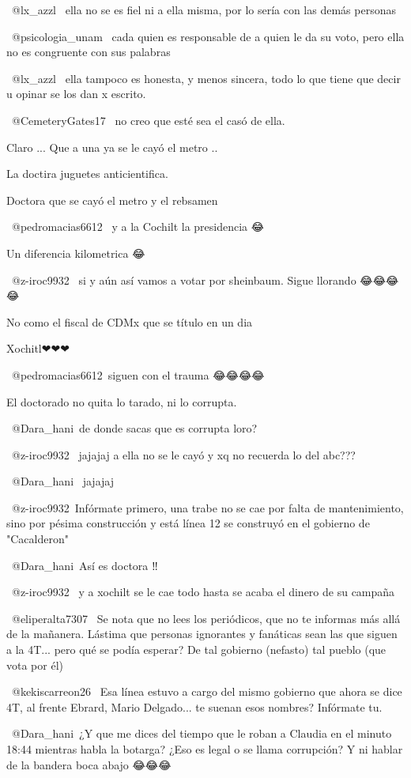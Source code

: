  @lx_azzl  ella no se es fiel ni a ella misma, por lo sería con las demás personas

 @psicologia_unam   cada quien es responsable de a quien le da su voto, pero ella no es congruente con sus palabras

 @lx_azzl  ella tampoco es honesta, y menos sincera, todo lo que tiene que decir u opinar se los dan x escrito.

 @CemeteryGates17  no creo que esté sea el casó de ella.

Claro ... Que a una ya se le cayó el metro ..

La doctira juguetes anticientifica.

Doctora  que se cayó el metro y el rebsamen

​ @pedromacias6612  y a la Cochilt la presidencia 😂

Un diferencia kilometrica 😂

 @z-iroc9932  si y aún así vamos a votar por sheinbaum. Sigue llorando 😂😂😂😂

No como el fiscal de CDMx que se título en un dia

Xochitl❤❤❤

​ @pedromacias6612 siguen con el trauma 😂😂😂😂

El doctorado no quita lo tarado, ni lo corrupta.

 @Dara_hani de donde sacas que es corrupta loro?

 @z-iroc9932  jajajaj a ella no se le cayó y xq no recuerda lo del abc???

 @Dara_hani  jajajaj

​ @z-iroc9932 Infórmate primero, una trabe no se cae por falta de mantenimiento, sino por pésima construcción y está línea 12 se construyó en el gobierno de "Cacalderon"

​ @Dara_hani Así es doctora ‼️

 @z-iroc9932  y a xochilt se le cae todo hasta se acaba el dinero de su campaña

 @eliperalta7307  Se nota que no lees los periódicos, que no te informas más allá de la mañanera. Lástima que personas ignorantes y fanáticas sean las que siguen a la 4T... pero qué se podía esperar? De tal gobierno (nefasto) tal pueblo (que vota por él)

 @kekiscarreon26  Esa línea estuvo a cargo del mismo gobierno que ahora se dice 4T, al frente Ebrard, Mario Delgado... te suenan esos nombres? Infórmate tu.

​ @Dara_hani ¿Y que me dices del tiempo que le roban a Claudia en el minuto 18:44 mientras habla la botarga? ¿Eso es legal o se llama corrupción? Y ni hablar de la bandera boca abajo 😂😂😂


